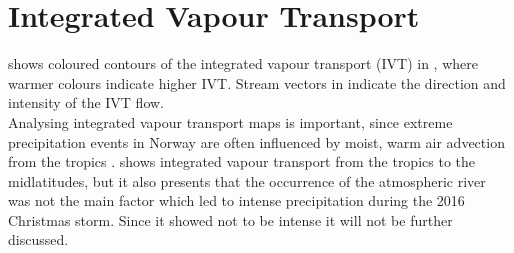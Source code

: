 \section{Integrated Vapour Transport}
 \label{sec:weather:atm_riv}
 shows coloured contours of the integrated vapour transport (IVT) in \SI{}{\IVT}, where warmer colours indicate higher IVT. 
Stream vectors in  indicate the direction and intensity of the IVT flow. 
\\
Analysing integrated vapour transport maps is important, since extreme precipitation events in Norway are often influenced by moist, warm air advection from the tropics \citep{azad_extreme_2017}.  shows integrated vapour transport from the tropics to the midlatitudes, but it also presents that the occurrence of the atmospheric river was not the main factor which led to intense precipitation during the 2016 Christmas storm. 
Since it showed not to be intense it will not be further discussed.
